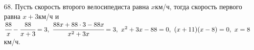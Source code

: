 68. Пусть скорость второго велосипедиста равна $x$км/ч, тогда скорость первого равна $x+3$км/ч и $\cfrac{88}{x}-\cfrac{88}{x+3}=3,\ \cfrac{88x+88\cdot3-88x}{x^2+3x}=3,\ x^2+3x-88=0,\ (x+11)(x-8)=0,\ x=8$км/ч.\\
